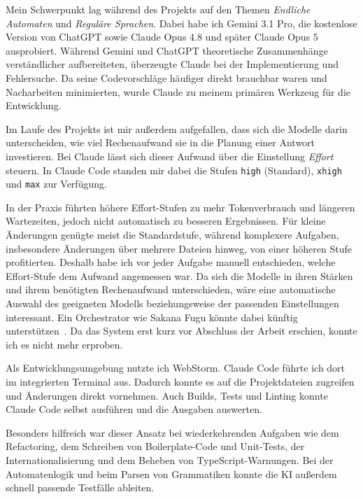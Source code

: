 
Mein Schwerpunkt lag während des Projekts auf den Themen \emph{Endliche Automaten}
und \emph{Reguläre Sprachen}.
Dabei habe ich Gemini 3.1 Pro, die kostenlose Version von ChatGPT sowie 
Claude Opus 4.8 und später Claude Opus 5 ausprobiert.
Während Gemini und ChatGPT theoretische Zusammenhänge verständlicher aufbereiteten,
überzeugte Claude bei der Implementierung und Fehlersuche.
Da seine Codevorschläge häufiger direkt brauchbar waren und Nacharbeiten minimierten,
wurde Claude zu meinem primären Werkzeug für die Entwicklung.

Im Laufe des Projekts ist mir außerdem aufgefallen, dass sich die Modelle darin unterscheiden, 
wie viel Rechenaufwand sie in die Planung einer Antwort investieren.
Bei Claude lässt sich dieser Aufwand über die Einstellung \emph{Effort} steuern. 
In Claude Code standen mir dabei die Stufen \texttt{high} (Standard), \texttt{xhigh} und \texttt{max} zur Verfügung.

In der Praxis führten höhere Effort-Stufen zu mehr Tokenverbrauch und längeren Wartezeiten, 
jedoch nicht automatisch zu besseren Ergebnissen. Für kleine Änderungen genügte meist die Standardstufe, 
während komplexere Aufgaben, insbesondere Änderungen über mehrere Dateien hinweg, 
von einer höheren Stufe profitierten. Deshalb habe ich vor jeder Aufgabe manuell entschieden, 
welche Effort-Stufe dem Aufwand angemessen war. 
Da sich die Modelle in ihren Stärken und ihrem benötigten Rechenaufwand unterschieden, wäre eine automatische Auswahl 
des geeigneten Modells beziehungsweise der passenden Einstellungen interessant. 
Ein Orchestrator wie Sakana Fugu könnte dabei künftig unterstützen~\cite{sakana2026fugu}. 
Da das System erst kurz vor Abschluss der Arbeit erschien, konnte ich es nicht mehr erproben.


Als Entwicklungsumgebung nutzte ich WebStorm.
Claude Code führte ich dort im integrierten Terminal aus.
Dadurch konnte es auf die Projektdateien zugreifen und Änderungen direkt vornehmen.
Auch Builds, Tests und Linting konnte Claude Code selbst ausführen und die Ausgaben auswerten.

Besonders hilfreich war dieser Ansatz bei wiederkehrenden Aufgaben wie dem Refactoring, 
dem Schreiben von Boilerplate-Code und Unit-Tests, der Internationalisierung 
und dem Beheben von TypeScript-Warnungen.
Bei der Automatenlogik und beim Parsen von Grammatiken konnte die KI außerdem schnell
passende Testfälle ableiten.

